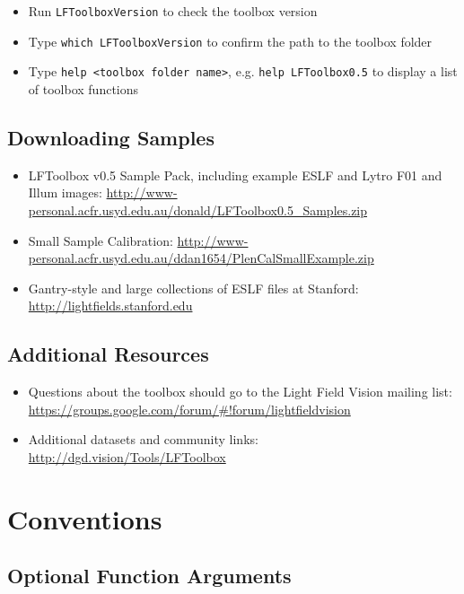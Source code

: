 \documentclass[onecolumn]{article}
\newcommand{\SymbolText}[1]{\texttt{\small #1}}
\begin{document}
\begin{itemize}[leftmargin=2.8em,itemsep=0em,rightmargin=0.5cm]
\item Run \SymbolText{LFToolboxVersion} to check the toolbox version
\item Type \SymbolText{which LFToolboxVersion} to confirm the path to the toolbox folder
\item Type \SymbolText{help <toolbox folder name>}, e.g. \SymbolText{help LFToolbox0.5} to display a list of toolbox functions
\end{itemize} 

\subsection{Downloading Samples}

\begin{itemize}[leftmargin=2.2em,itemsep=0em,rightmargin=0.5cm]
\item LFToolbox v0.5 Sample Pack, including example ESLF and Lytro F01 and Illum images: \url{http://www-personal.acfr.usyd.edu.au/donald/LFToolbox0.5_Samples.zip}
\item Small Sample Calibration: \url{http://www-personal.acfr.usyd.edu.au/ddan1654/PlenCalSmallExample.zip}
\item Gantry-style and large collections of ESLF files at Stanford: \url{http://lightfields.stanford.edu}
\end{itemize}

\subsection{Additional Resources}

\begin{itemize}
\item Questions about the toolbox should go to the Light Field Vision mailing list: \url{https://groups.google.com/forum/#!forum/lightfieldvision}
\item Additional datasets and community links: \url{http://dgd.vision/Tools/LFToolbox}
\end{itemize}

\section{Conventions}
\label{sect_Conventions}

\subsection{Optional Function Arguments}
\end{document}
